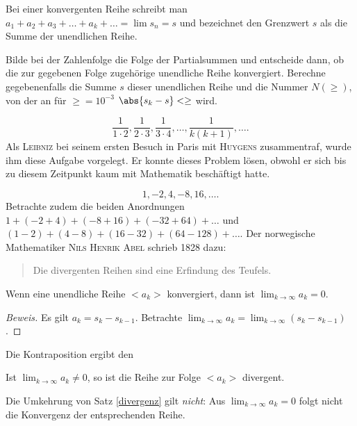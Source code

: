 \documentclass[%
11pt,%
twoside,%
titlepage,%
german,%
headsepline%
]{scrartcl}
\begin{document}
Bei einer konvergenten Reihe schreibt man $a_1+a_2+a_3+\dots+a_k+\dots = \lim s_n = s$
und bezeichnet den Grenzwert $s$ als die Summe der unendlichen Reihe.

\begin{ueb}
Bilde bei der Zahlenfolge die Folge der Partialsummen und entscheide dann, ob die zur gegebenen Folge zugeh\"orige unendliche Reihe konvergiert. Berechne gegebenenfalls die Summe $s$ dieser unendlichen Reihe und die Nummer $N(\ge)$, von der an f\"ur $\ge=10^{-3}$ $\abs{s_k-s}<\ge$ wird.
\begin{enumeratea}
\item $$\frac{1}{1\cdot2}, \frac{1}{2\cdot3}, \frac{1}{3\cdot4}, \dots, \frac{1}{k(k+1)}, \dots.$$
Als \textsc{Leibniz} bei seinem ersten Besuch in Paris mit \textsc{Huygens} zusammentraf, wurde ihm diese Aufgabe vorgelegt. Er konnte dieses Problem l\"osen, obwohl er sich bis zu diesem Zeitpunkt kaum mit Mathematik besch\"aftigt hatte.
\item $$1, -2, 4, -8, 16, \dots.$$
Betrachte zudem die beiden Anordnungen $1+(-2+4)+ (-8+16)+(-32+64)+\dots$ und $(1-2)+ (4-8)+(16-32)+ (64-128)+\dots$. Der norwegische Mathematiker \textsc{Nils Henrik Abel} schrieb 1828 dazu:
\begin{quote}
Die divergenten Reihen sind eine Erfindung des Teufels.
\end{quote}
\end{enumeratea}
\end{ueb}

\begin{csatz}{}
Wenn eine unendliche Reihe $<a_k>$ konvergiert, dann ist $\lim_{k\to\infty}a_k = 0$.
\end{csatz}
\begin{proof}[Beweis]
Es gilt $a_k=s_k-s_{k-1}$. Betrachte $\lim_{k\to\infty}a_k=\lim_{k\to\infty}(s_k-s_{k-1})$.
\end{proof}

Die Kontraposition ergibt den

\begin{csatz}{}\label{divergenz}
Ist $\lim_{k\to\infty}a_k\neq0$, so ist die Reihe zur Folge $<a_k>$ divergent.
\end{csatz}

\begin{bem}
Die Umkehrung von Satz \ref{divergenz} gilt \emph{nicht}: Aus $\lim_{k\to\infty}a_k=0$ folgt nicht die Konvergenz der entsprechenden Reihe.
\end{bem}
\end{document}
